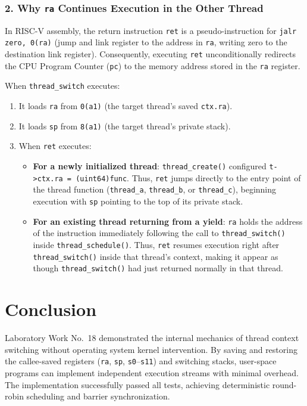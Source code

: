 \documentclass[12pt,a4paper]{article}
\begin{document}
\subsubsection{2. Why \texttt{ra} Continues Execution in the Other Thread}
In RISC-V assembly, the return instruction \texttt{ret} is a pseudo-instruction for \texttt{jalr zero, 0(ra)} (jump and link register to the address in \texttt{ra}, writing zero to the destination link register). Consequently, executing \texttt{ret} unconditionally redirects the CPU Program Counter (\texttt{pc}) to the memory address stored in the \texttt{ra} register.

When \texttt{thread\_switch} executes:
\begin{enumerate}
    \item It loads \texttt{ra} from \texttt{0(a1)} (the target thread's saved \texttt{ctx.ra}).
    \item It loads \texttt{sp} from \texttt{8(a1)} (the target thread's private stack).
    \item When \texttt{ret} executes:
    \begin{itemize}
        \item \textbf{For a newly initialized thread}: \texttt{thread\_create()} configured \texttt{t->ctx.ra = (uint64)func}. Thus, \texttt{ret} jumps directly to the entry point of the thread function (\texttt{thread\_a}, \texttt{thread\_b}, or \texttt{thread\_c}), beginning execution with \texttt{sp} pointing to the top of its private stack.
        \item \textbf{For an existing thread returning from a yield}: \texttt{ra} holds the address of the instruction immediately following the call to \texttt{thread\_switch()} inside \texttt{thread\_schedule()}. Thus, \texttt{ret} resumes execution right after \texttt{thread\_switch()} inside that thread's context, making it appear as though \texttt{thread\_switch()} had just returned normally in that thread.
    \end{itemize}
\end{enumerate}

\section{Conclusion}
Laboratory Work No.~18 demonstrated the internal mechanics of thread context switching without operating system kernel intervention. By saving and restoring the callee-saved registers (\texttt{ra}, \texttt{sp}, \texttt{s0}--\texttt{s11}) and switching stacks, user-space programs can implement independent execution streams with minimal overhead. The implementation successfully passed all tests, achieving deterministic round-robin scheduling and barrier synchronization.
\end{document}
